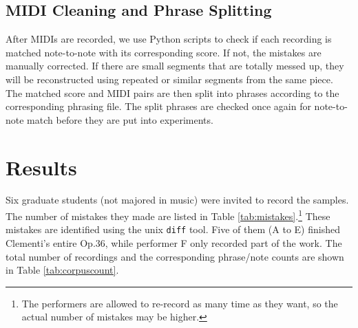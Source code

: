 \subsection{MIDI Cleaning and Phrase Splitting}
  After MIDIs are recorded, we use Python scripts to check if each recording is matched note-to-note with its corresponding score. If not, the mistakes are manually corrected. %
  If there are small segments that are totally messed up, they will be reconstructed using repeated or similar segments from the same piece. The matched score and MIDI pairs are then split into phrases according to the corresponding phrasing file. The split phrases are checked once again for note-to-note match before they are put into experiments.

\section{Results}
Six graduate students (not majored in music) were invited to record the samples. The number of mistakes they made are listed in Table \ref{tab:mistakes}.\footnote{The performers are allowed to re-record as many time as they want, so the actual number of mistakes may be higher.} These mistakes are identified using the unix \texttt{diff}\cite{diff} tool. Five of them (A to E) finished Clementi's entire Op.36, while performer F only recorded part of the work. The total number of recordings and the corresponding phrase/note counts are shown in Table \ref{tab:corpuscount}. 

